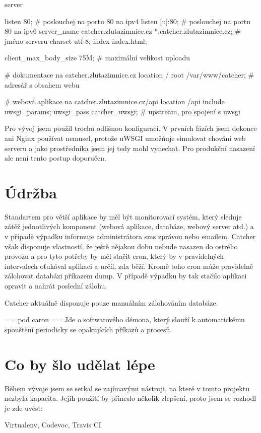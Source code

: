 server {
    listen       80;                                                # poslouchej na portu 80 na ipv4
    listen       [::]:80;                                           # poslouchej na portu 80 na ipv6
    server_name  catcher.zlutazimnice.cz *.catcher.zlutazimnice.cz; # jméno serveru
    charset      utf-8;
    index        index.html;

    client_max_body_size 75M;                                       # maximální velikost uploadu

    # dokumentace na catcher.zlutazimnice.cz
    location / {
        root   /var/www/catcher;                                    # adresář s obsahem webu
    }

    # webová aplikace na catcher.zlutazimnice.cz/api
    location /api {
        include     uwsgi_params;
        uwsgi_pass  catcher_uwsgi;                                  # upstream, pro spojení s uwsgi
    }
}

Pro vývoj jsem použil trochu odlišnou konfiguraci. V prvních fázích jsem dokonce ani Nginx používat nemusel, protože uWSGI umožňuje simulovat chování web serveru a jako prostředníka jsem jej tedy mohl vynechat. Pro produkční nasazení ale není tento postup doporučen.

\section{Údržba}

Standartem pro větší aplikace by měl být monitorovací systém, který sleduje zátěž jednotlivých komponent (webová aplikace, databáze, webový server atd.) a v případě výpadku informuje administrátora sms zprávou nebo emailem. Catcher však disponuje vlastností, že ještě nějakou dobu nebude nasazen do ostrého provozu a pro tyto potřeby by měl stačit cron, který by v pravidelných intervalech oťukával aplikaci a určil, zda běží. Kromě toho cron může pravidelně zálohovat databázi příkazem dump. V případě výpadku by tak stačilo aplikaci opravit a nahrát poslední zálohu.

Catcher aktuálně disponuje pouze manuálním zálohováním databáze.

== pod carou ==
Jde o softwarového démona, který slouží k automatickému spouštění periodicky se opakujících příkazů a procesů.

\section{Co by šlo udělat lépe}

Během vývoje jsem se setkal se zajímavými nástroji, na které v tomto projektu nezbyla kapacita. Jejih použití by přineslo několik zlepšení, proto jsem se rozhodl je zde uvést:


Virtualenv, Codevoc, Travis CI

